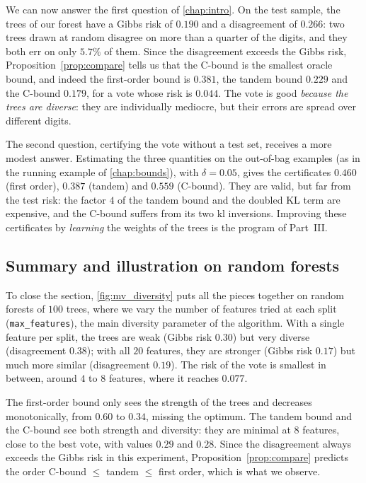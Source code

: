 \begin{running}
We can now answer the first question of \cref{chap:intro}. On the test sample,
the trees of our forest have a Gibbs risk of $0.190$ and a disagreement of
$0.266$: two trees drawn at random disagree on more than a quarter of the digits,
and they both err on only $5.7\%$ of them. Since the disagreement exceeds the
Gibbs risk, Proposition~\ref{prop:compare} tells us that the C-bound is the
smallest oracle bound, and indeed the first-order bound is $0.381$, the tandem
bound $0.229$ and the C-bound $0.179$, for a vote whose risk is $0.044$. The
vote is good \emph{because the trees are diverse}: they are individually
mediocre, but their errors are spread over different digits.

The second question, certifying the vote without a test set, receives a more
modest answer. Estimating the three quantities on the out-of-bag examples (as in
the running example of \cref{chap:bounds}), with $\delta=0.05$, gives the
certificates $0.460$ (first order), $0.387$ (tandem) and $0.559$ (C-bound).
They are valid, but far from the test risk: the factor $4$ of the tandem bound
and the doubled KL term are expensive, and the C-bound suffers from its two kl
inversions. Improving these certificates by \emph{learning} the weights of the
trees is the program of Part~III.
\end{running}

\subsection{Summary and illustration on random forests}

To close the section, \cref{fig:mv_diversity} puts all the pieces together on
random forests of $100$ trees, where we vary the number of features tried at each split
(\texttt{max\_features}), the main diversity parameter of the algorithm. With a
single feature per split, the trees are weak (Gibbs risk $0.30$) but very diverse
(disagreement $0.38$); with all $20$ features, they are stronger (Gibbs risk
$0.17$) but much more similar (disagreement $0.19$). The risk of the vote is
smallest in between, around $4$ to $8$ features, where it reaches $0.077$.

The first-order bound only sees the strength of the trees and decreases monotonically,
from $0.60$ to $0.34$, missing the optimum. The tandem bound and the C-bound see
both strength and diversity: they are minimal at $8$ features, close to the
best vote, with values $0.29$ and $0.28$. Since the disagreement always exceeds
the Gibbs risk in this experiment, Proposition~\ref{prop:compare} predicts the
order C-bound $\leq$ tandem $\leq$ first order, which is what we observe.


